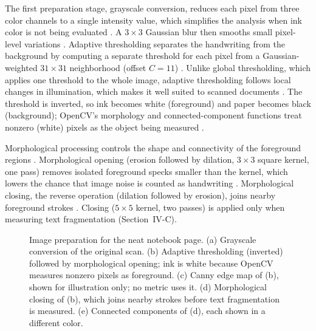 The first preparation stage, grayscale conversion, reduces each pixel from
three color channels to a single intensity value, which simplifies the
analysis when ink color is not being evaluated \citep{gonzalez2018dip}. A
$3 \times 3$ Gaussian blur then smooths small pixel-level variations
\citep{gonzalez2018dip, opencv_filtering}. Adaptive thresholding separates the
handwriting from the background by computing a separate threshold for each
pixel from a Gaussian-weighted $31 \times 31$ neighborhood (offset $C = 11$)
\citep{opencv_misc_transforms}. Unlike global thresholding, which applies one
threshold to the whole image, adaptive thresholding follows local changes in
illumination, which makes it well suited to scanned documents
\citep{sauvola2000binarization, bradley2007adaptive, binmakhashen2019layout}.
The threshold is inverted, so ink becomes white (foreground) and paper becomes
black (background); OpenCV's morphology and connected-component functions
treat nonzero (white) pixels as the object being measured
\citep{opencv_morph_tutorial, opencv_shape}.

Morphological processing controls the shape and connectivity of the
foreground regions \citep{serra1982morphology, haralick1987morphology}.
Morphological opening (erosion followed by dilation, $3 \times 3$ square
kernel, one pass) removes isolated foreground specks smaller than the kernel,
which lowers the chance that image noise is counted as handwriting
\citep{haralick1987morphology, gonzalez2018dip}. Morphological closing, the
reverse operation (dilation followed by erosion), joins nearby foreground
strokes \citep{haralick1987morphology}. Closing ($5 \times 5$ kernel, two
passes) is applied only when measuring text fragmentation (Section~IV-C).


\begin{figure}[t]
  \centering
  \caption{Image preparation for the neat notebook page.
  (a) Grayscale conversion of the original scan.
  (b) Adaptive thresholding (inverted) followed by morphological opening; ink
      is white because OpenCV measures nonzero pixels as foreground.
  (c) Canny edge map of (b), shown for illustration only; no metric uses it.
  (d) Morphological closing of (b), which joins nearby strokes before text
      fragmentation is measured.
  (e) Connected components of (d), each shown in a different color.}
  \label{fig:preparation}
\end{figure}

